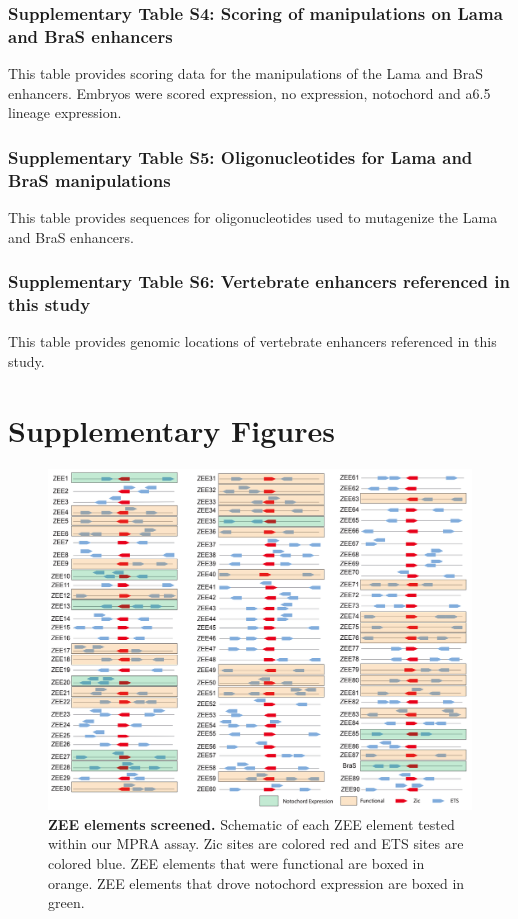 \subsubsection{Supplementary Table S4: Scoring of manipulations on Lama and BraS enhancers}
This table provides scoring data for the manipulations of the Lama and BraS enhancers. Embryos were scored expression, no expression, notochord and a6.5 lineage expression.

\subsubsection{Supplementary Table S5: Oligonucleotides for Lama and BraS manipulations}
This table provides sequences for oligonucleotides used to mutagenize the Lama and BraS enhancers.

\subsubsection{Supplementary Table S6: Vertebrate enhancers referenced in this study}
This table provides genomic locations of vertebrate enhancers referenced in this study.

\section{Supplementary Figures}

\begin{figure}[h]
    \centering
    \includegraphics[scale=.2]{2_figures-and-files/FigS1_ZEE-Library.png}
    \caption[ZEE elements screened]{\textbf{ZEE elements screened.} Schematic of each ZEE element tested within our MPRA assay. Zic sites are colored red and ETS sites are colored blue. ZEE elements that were functional are boxed in orange. ZEE elements that drove notochord expression are boxed in green.}
    \label{fig:supplement zee elements screened}
\end{figure}

